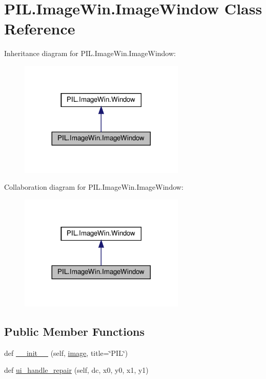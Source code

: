 \hypertarget{classPIL_1_1ImageWin_1_1ImageWindow}{}\section{P\+I\+L.\+Image\+Win.\+Image\+Window Class Reference}
\label{classPIL_1_1ImageWin_1_1ImageWindow}


Inheritance diagram for P\+I\+L.\+Image\+Win.\+Image\+Window\+:
\nopagebreak
\begin{figure}[H]
\begin{center}
\leavevmode
\includegraphics[width=224pt]{classPIL_1_1ImageWin_1_1ImageWindow__inherit__graph}
\end{center}
\end{figure}


Collaboration diagram for P\+I\+L.\+Image\+Win.\+Image\+Window\+:
\nopagebreak
\begin{figure}[H]
\begin{center}
\leavevmode
\includegraphics[width=224pt]{classPIL_1_1ImageWin_1_1ImageWindow__coll__graph}
\end{center}
\end{figure}
\subsection*{Public Member Functions}
\begin{DoxyCompactItemize}
\item 
def \hyperlink{classPIL_1_1ImageWin_1_1ImageWindow_adc45ceb933102501aec50d762059d43a}{\+\_\+\+\_\+init\+\_\+\+\_\+} (self, \hyperlink{classPIL_1_1ImageWin_1_1ImageWindow_a9edb1e11d923171cac68de8c3ab8daca}{image}, title=\char`\"{}P\+IL\char`\"{})
\item 
def \hyperlink{classPIL_1_1ImageWin_1_1ImageWindow_a320ce9356c3ab1cbed61f9dbf1f33dd2}{ui\+\_\+handle\+\_\+repair} (self, dc, x0, y0, x1, y1)
\end{DoxyCompactItemize}

